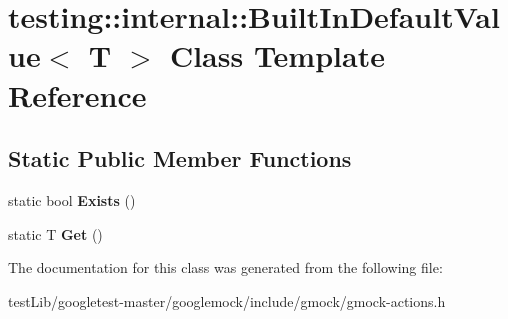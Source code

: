 \hypertarget{classtesting_1_1internal_1_1BuiltInDefaultValue}{}\section{testing\+:\+:internal\+:\+:Built\+In\+Default\+Value$<$ T $>$ Class Template Reference}
\label{classtesting_1_1internal_1_1BuiltInDefaultValue}
\subsection*{Static Public Member Functions}
\begin{DoxyCompactItemize}
\item 
\mbox{\label{classtesting_1_1internal_1_1BuiltInDefaultValue_a35207bc20a493b0efb3980eb9a08dd2f}} 
static bool {\bfseries Exists} ()
\item 
\mbox{\label{classtesting_1_1internal_1_1BuiltInDefaultValue_a7e26c1df14a887c8f393b29d6ea162e6}} 
static T {\bfseries Get} ()
\end{DoxyCompactItemize}


The documentation for this class was generated from the following file\+:\begin{DoxyCompactItemize}
\item 
test\+Lib/googletest-\/master/googlemock/include/gmock/gmock-\/actions.\+h\end{DoxyCompactItemize}
